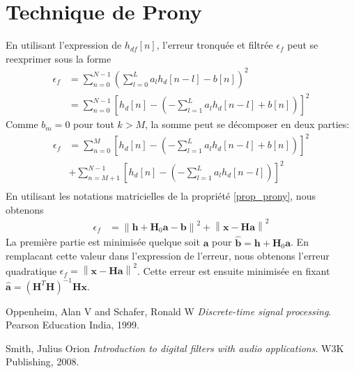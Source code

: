 \documentclass[11pt,a4paper]{IEEEtran}
\begin{document}
\section{Technique de Prony}
\label{ap_prony}

En utilisant l'expression de $h_{df}[n]$, l'erreur tronquée et filtrée $\epsilon_f$ peut se reexprimer sous la forme
\begin{align}
\epsilon_f&=\sum_{n=0}^{N-1}\left(\sum_{l=0}^{L}a_l h_d[n-l]-b[n]\right)^2\\
&=\sum_{n=0}^{N-1}\left[h_d[n]-\left(-\sum_{l=1}^{L}a_l h_d[n-l]+b[n]\right)\right]^2
\end{align}
Comme $b_m=0$ pour tout $k>M$, la somme peut se décomposer en deux parties:
\begin{align}
\epsilon_f&=\sum_{n=0}^{M}\left[h_d[n]-\left(-\sum_{l=1}^{L}a_l h_d[n-l]+b[n]\right)\right]^2\nonumber\\
&+\sum_{n=M+1}^{N-1}\left[h_d[n]-\left(-\sum_{l=1}^{L}a_l h_d[n-l]\right)\right]^2\\
\end{align}
En utilisant les notations matricielles de la propriété \ref{prop_prony}, nous obtenons
\begin{align}
\epsilon_f&=\left\|\textbf{h}+\textbf{H}_0\textbf{a}-\textbf{b}\right \|^2+\left\| \textbf{x}-\textbf{H}\textbf{a}\right \|^2
\end{align}
La première partie est minimisée quelque soit $\textbf{a}$ pour $\widehat{\textbf{b}}=\textbf{h}+\textbf{H}_0\textbf{a}$. En remplacant cette valeur dans l'expression de l'erreur, nous obtenons l'erreur quadratique $\epsilon_f=\left\|\textbf{x}-\textbf{H}\textbf{a}\right\|^2$. Cette erreur est ensuite minimisée en fixant $\widehat{\textbf{a}}=\left(\textbf{H}^T\textbf{H}\right)^{-1}\textbf{H}\textbf{x}$.


\begin{thebibliography}{9}
Oppenheim, Alan V and Schafer, Ronald W
\textit{Discrete-time signal processing}.
Pearson Education India, 1999.

Smith, Julius Orion
\textit{Introduction to digital filters with audio applications}.
 W3K Publishing, 2008.
 \end{thebibliography}
\end{document}
